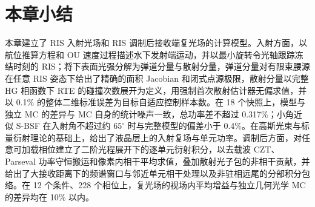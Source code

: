\section{本章小结}

本章建立了 RIS 入射光场和 RIS 调制后接收端复光场的计算模型。入射方面，以航位推算方程和 OU 速度过程描述水下发射端运动，并以最小旋转令光轴跟踪冻结时刻的 RIS；将下表面光强分解为弹道分量与散射分量，弹道分量对有限束腰源在任意 RIS 姿态下给出了精确的面积 Jacobian 和闭式点源极限，散射分量以完整 HG 相函数下 RTE 的碰撞次数展开为定义，用强制首次散射估计器无偏求值，并以 0.1\% 的整体二维标准误差为目标自适应控制样本数。在 18 个快照上，模型与独立 MC 的差异与 MC 自身的统计噪声一致，总功率差不超过 0.317\%；小角近似 S-BSF 在入射角不超过约 $65^\circ$ 时与完整模型的偏差小于 0.4\%。在高斯光束与标量衍射理论的基础上，给出了液晶层上的入射复场与单元功率。调制后方面，对任意可加载相位建立了二阶光程展开下的逐单元衍射积分，以去载波 CZT、Parseval 功率守恒搬运和像素内相干平均求值，叠加散射光子包的非相干贡献，并给出了大接收距离下的频谱窗口与邻近单元相干处理以及非驻相远尾的分部积分包络。在 12 个条件、228 个相位上，复光场的视场内平均增益与独立几何光学 MC 的差异均在 10\% 以内。
